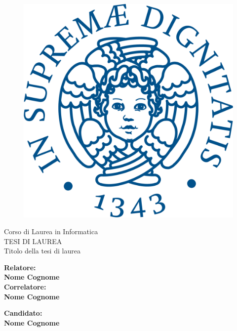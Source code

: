 \documentclass[12pt]{report}
\begin{document}
\begin{titlepage}
\begin{figure}
    \centering\includegraphics[scale=0.5]{immagini/cherubino_pant541.png}
\end{figure}

\begin{center}
    {\LARGE{ Corso di Laurea in Informatica \\}}
    \vspace{2cm}
    {\Large { TESI DI LAUREA }}\\
    \vspace{2cm}
    {\Large { Titolo della tesi di laurea }}
\end{center}

\vspace{2cm}

\begin{minipage}[t]{0.47\textwidth}
	{\large{\bf Relatore:\\ Nome Cognome}}
	\vspace{0.5cm}
	{\large{\bf \\Correlatore:\\ Nome Cognome}}
\end{minipage}\hfill\begin{minipage}[t]{0.47\textwidth}\raggedleft
	{\large{\bf Candidato: \\ Nome Cognome\\ }}
\end{minipage}

\vspace{25mm}

\end{titlepage}
\end{document}
